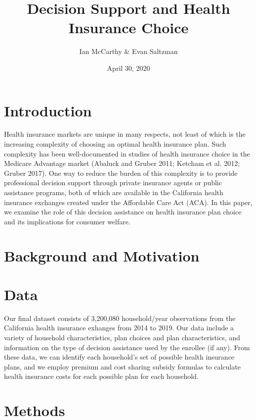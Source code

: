 \documentclass[
  12pt,
]{article}
\title{Decision Support and Health Insurance Choice}
\author{Ian McCarthy \& Evan Saltzman}
\date{April 30, 2020}
\begin{document}
\maketitle

\hypertarget{introduction}{%
\section{Introduction}\label{introduction}}

Health insurance markets are unique in many respects, not least of which is the increasing complexity of choosing an optimal health insurance plan. Such complexity has been well-documented in studies of health insurance choice in the Medicare Advantage market (Abaluck and Gruber 2011; Ketcham et al. 2012; Gruber 2017). One way to reduce the burden of this complexity is to provide professional decision support through private insurance agents or public assistance programs, both of which are available in the California health insurance exchanges created under the Affordable Care Act (ACA). In this paper, we examine the role of this decision assistance on health insurance plan choice and its implications for consumer welfare.

\hypertarget{background-and-motivation}{%
\section{Background and Motivation}\label{background-and-motivation}}

\hypertarget{data}{%
\section{Data}\label{data}}

Our final dataset consists of 3,200,080 household/year observations from the California health insurance exhanges from 2014 to 2019. Our data include a variety of household characteristics, plan choices and plan characteristics, and information on the type of decision assistance used by the enrollee (if any). From these data, we can identify each household's set of possible health insurance plans, and we employ premium and cost sharing subsidy formulas to calculate health insurance costs for each possible plan for each household.

\hypertarget{methods}{%
\section{Methods}\label{methods}}
\end{document}
